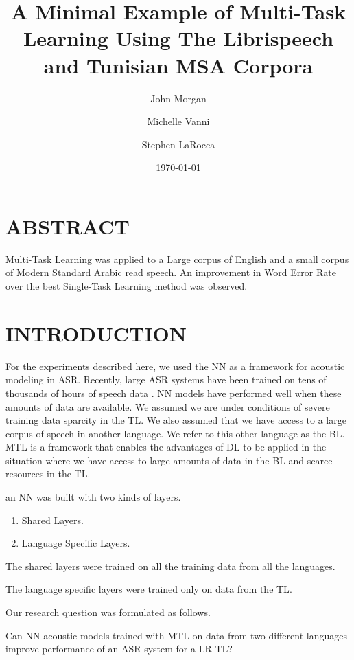 \documentclass[11pt]{article}
\author{John Morgan \and Michelle Vanni \and Stephen LaRocca }
\date{\today}
\title{A Minimal Example of Multi-Task Learning Using The Librispeech  and Tunisian MSA Corpora}
\begin{document}
\maketitle


\section{ABSTRACT}
\label{sec-1}
Multi-Task Learning was applied to a Large corpus of English and a small corpus of Modern Standard Arabic  read speech. 
An improvement in Word Error Rate over the best Single-Task Learning method was observed. 
\section{INTRODUCTION}
\label{sec-2}
For the experiments described here, we used the \gls{NN} as a framework for acoustic modeling in \gls{ASR}. 
Recently, large \gls{ASR} systems have been trained on tens of thousands of hours of speech data \cite{Heigold13multilingualacoustic}. 
\gls{NN} models have performed well when these amounts of data are available. 
We assumed we are under conditions of severe training data sparcity in the \gls{TL}.
We also assumed that we have access to a large corpus of speech in another language. 
We refer to this other language as the \gls{BL}.
\gls{MTL}\cite{Caruana93multitasklearning:} is a framework that enables the advantages of \gls{DL} to be applied in the situation where we have access to large amounts of data in the \gls{BL} and scarce   resources in the \gls{TL}.  

an \gls{NN} was built with two kinds of layers.
\begin{enumerate}
\item Shared Layers.
\item Language Specific Layers.
\end{enumerate}

The shared layers were trained on all the training data from all the languages.

The language specific layers were trained only on data from the \gls{TL}.

Our research question was formulated as follows.

Can \gls{NN} acoustic models trained with \gls{MTL} on data  from  two different languages improve performance of an  \gls{ASR} system for a \gls{LR} \gls{TL}?
\end{document}
